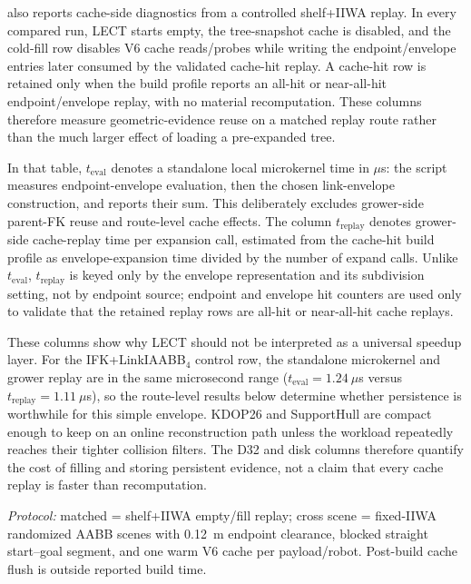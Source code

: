\documentclass[journal]{IEEEtran}
\begin{document}
 also reports cache-side diagnostics from a
controlled shelf+IIWA replay. In every compared run, LECT starts empty, the
tree-snapshot cache is disabled, and the cold-fill row disables V6 cache
reads/probes while writing the endpoint/envelope entries later consumed by the validated
cache-hit replay. A cache-hit row is retained only when the build profile reports an
all-hit or near-all-hit endpoint/envelope replay, with no material recomputation.
These columns therefore measure
geometric-evidence reuse on a matched replay route rather than the much larger
effect of loading a pre-expanded tree.

In that table, $t_{\mathrm{eval}}$ denotes a standalone local microkernel time
in $\mu$s: the script measures endpoint-envelope evaluation, then the chosen
link-envelope construction, and reports their sum. This deliberately excludes
grower-side parent-FK reuse and route-level cache effects. The column
$t_{\mathrm{replay}}$ denotes grower-side cache-replay time per expansion call,
estimated from the cache-hit build profile as envelope-expansion time divided
by the number of expand calls. Unlike $t_{\mathrm{eval}}$,
$t_{\mathrm{replay}}$ is keyed only by the envelope representation and its
subdivision setting, not by endpoint source; endpoint and envelope hit counters
are used only to validate that the retained replay rows are all-hit or
near-all-hit cache replays.

These columns show why LECT should not be interpreted as a universal speedup
layer. For the IFK+LinkIAABB$_4$ control row, the standalone microkernel and
grower replay are in the same microsecond range
($t_{\mathrm{eval}}=1.24~\mu$s versus
$t_{\mathrm{replay}}=1.11~\mu$s), so the route-level results below determine
whether persistence is worthwhile for this simple envelope. KDOP26 and
SupportHull are compact enough to keep on an online reconstruction path unless
the workload repeatedly reaches their tighter collision filters. The D32 and
disk columns therefore quantify the cost of filling and storing persistent
evidence, not a claim that every cache replay is faster than recomputation.

\FloatBarrier
\begin{table}[!htbp]
  \centering
  \caption{LECT cache reuse and storage footprint for retained envelope payloads.}
  \label{tab:marcucci_envelope_build}
  \scriptsize
  \setlength{\tabcolsep}{1.6pt}
  \resizebox{\columnwidth}{!}{}
  \vspace{1pt}
  \parbox{0.96\columnwidth}{\scriptsize\emph{Protocol:} matched = shelf+IIWA empty/fill replay; cross scene = fixed-IIWA randomized AABB scenes with 0.12~m endpoint clearance, blocked straight start--goal segment, and one warm V6 cache per payload/robot. Post-build cache flush is outside reported build time.}
\end{table}
\end{document}
